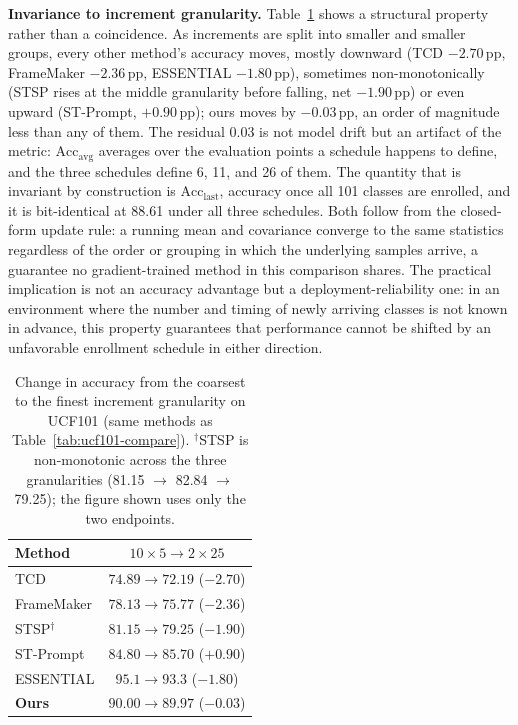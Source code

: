 \documentclass[11pt]{article}
\begin{document}
\textbf{Invariance to increment granularity.} Table~\ref{tab:invariance}
shows a structural property rather than a coincidence. As increments are
split into smaller and smaller groups, every other method's accuracy
moves, mostly downward (TCD $-2.70$\,pp, FrameMaker $-2.36$\,pp, ESSENTIAL
$-1.80$\,pp), sometimes non-monotonically (STSP rises at the middle
granularity before falling, net $-1.90$\,pp) or even upward (ST-Prompt,
$+0.90$\,pp); ours moves by $-0.03$\,pp, an order of magnitude less than
any of them. The residual 0.03 is not model drift but an artifact of the
metric: $\mathrm{Acc}_{\mathrm{avg}}$ averages over the evaluation points a
schedule happens to define, and the three schedules define 6, 11, and 26 of
them. The quantity that is invariant by construction is
$\mathrm{Acc}_{\mathrm{last}}$, accuracy once all 101 classes are enrolled,
and it is bit-identical at 88.61 under all three schedules. Both follow
from the closed-form update rule: a running mean and covariance converge to
the same statistics regardless of the order or grouping in which the
underlying samples arrive, a guarantee no gradient-trained method in this
comparison shares.
The practical implication is not an accuracy advantage but a
deployment-reliability one: in an environment where the number and timing
of newly arriving classes is not known in advance, this property
guarantees that performance cannot be shifted by an unfavorable enrollment
schedule in either direction.

\begin{table}[h]
\centering
\caption{Change in accuracy from the coarsest to the finest increment
granularity on UCF101 (same methods as Table~\ref{tab:ucf101-compare}).
$^\dagger$STSP is non-monotonic across the three granularities
(81.15 $\to$ 82.84 $\to$ 79.25); the figure shown uses only the two
endpoints.}
\label{tab:invariance}
\small
\begin{tabular}{@{}lc@{}}
\toprule
Method & $10\times5 \to 2\times25$ \\
\midrule
TCD & $74.89 \to 72.19$ ($-2.70$) \\
FrameMaker & $78.13 \to 75.77$ ($-2.36$) \\
STSP$^\dagger$ & $81.15 \to 79.25$ ($-1.90$) \\
ST-Prompt & $84.80 \to 85.70$ ($+0.90$) \\
ESSENTIAL & $95.1 \to 93.3$ ($-1.80$) \\
\textbf{Ours} & $90.00 \to 89.97$ (\textbf{$-0.03$}) \\
\bottomrule
\end{tabular}
\end{table}
\end{document}
